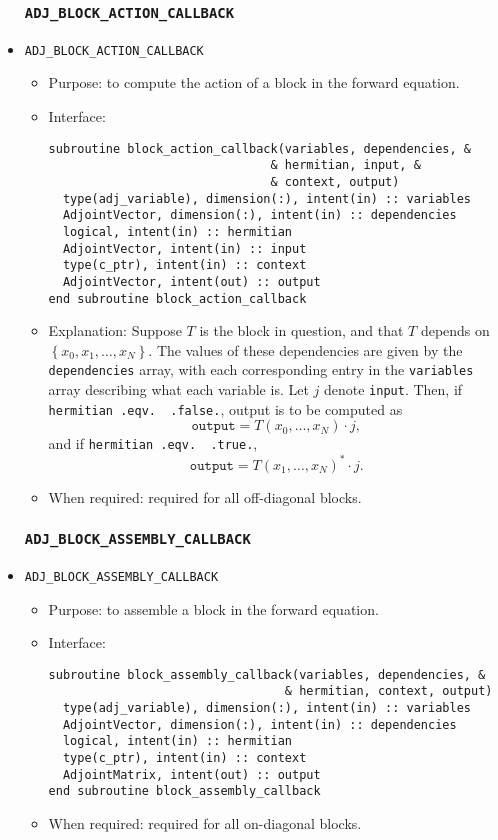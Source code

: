 \documentclass[10pt,authoryear]{elsarticle}
\begin{document}
\begin{itemize}
\subsubsection{\texttt{ADJ\_BLOCK\_ACTION\_CALLBACK}}
\item \texttt{ADJ\_BLOCK\_ACTION\_CALLBACK}
 \begin{itemize}
 \item Purpose: to compute the action of a block in the forward equation.
 \item Interface:
\begin{verbatim}
subroutine block_action_callback(variables, dependencies, &
                               & hermitian, input, &
                               & context, output)
  type(adj_variable), dimension(:), intent(in) :: variables
  AdjointVector, dimension(:), intent(in) :: dependencies
  logical, intent(in) :: hermitian
  AdjointVector, intent(in) :: input
  type(c_ptr), intent(in) :: context
  AdjointVector, intent(out) :: output
end subroutine block_action_callback
\end{verbatim}
 \item Explanation: Suppose $T$ is the block in question, and that $T$ depends on $\left\{x_0, x_1, \dots, x_N\right\}$. The values of these
dependencies are given by the \texttt{dependencies} array, with each corresponding entry in the \texttt{variables} array describing what each variable is. Let $j$ denote \texttt{input}. Then,
if \texttt{hermitian .eqv. $\!\!\!\!\!\!\!$ .false.}, output is to be computed as
\begin{equation}
\texttt{output} = T(x_0, \dots, x_N) \cdot j,
\end{equation} 
and if \texttt{hermitian .eqv. $\!\!\!\!\!\!\!$ .true.},
\begin{equation}
\texttt{output} = T(x_1, \dots, x_N)^* \cdot j.
\end{equation} 
 \item When required: required for all off-diagonal blocks.
 \end{itemize}

\subsubsection{\texttt{ADJ\_BLOCK\_ASSEMBLY\_CALLBACK}}
\item \texttt{ADJ\_BLOCK\_ASSEMBLY\_CALLBACK}
 \begin{itemize}
 \item Purpose: to assemble a block in the forward equation.
 \item Interface:
\begin{verbatim}
subroutine block_assembly_callback(variables, dependencies, &
                                 & hermitian, context, output)
  type(adj_variable), dimension(:), intent(in) :: variables
  AdjointVector, dimension(:), intent(in) :: dependencies
  logical, intent(in) :: hermitian
  type(c_ptr), intent(in) :: context
  AdjointMatrix, intent(out) :: output
end subroutine block_assembly_callback
\end{verbatim}
 \item When required: required for all on-diagonal blocks.
 \end{itemize}


\end{itemize}
\end{document}
